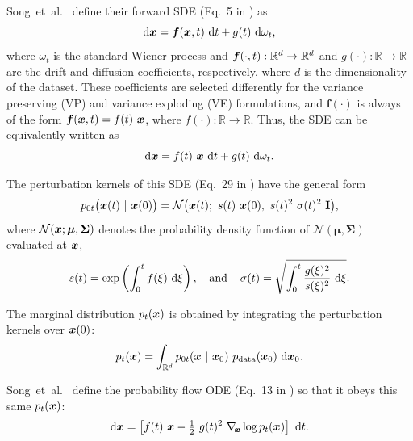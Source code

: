 Song~et~al.~\cite{Song2021sde} define their forward SDE (Eq.~5 in \cite{Song2021sde}) as
\begin{equation}
  \mathrm{d}\boldsymbol{x} = \boldsymbol{f}(\boldsymbol{x}, t) ~\mathrm{d} t + g(t) ~\mathrm{d} \omega_t
  \text{,}
\end{equation}
where $\omega_t$ is the standard Wiener process and $\boldsymbol{f}(\cdot, t): \mathbb{R}^d \rightarrow \mathbb{R}^d$ and $g(\cdot): \mathbb{R} \rightarrow \mathbb{R}$ are the drift and diffusion coefficients, respectively, where $d$ is the dimensionality of the dataset.
These coefficients are selected differently for the variance preserving (VP) and variance exploding (VE) formulations, and $\boldsymbol{f}(\cdot)$ is always of the form $\boldsymbol{f}(\boldsymbol{x}, t) = f(t) ~\boldsymbol{x}$, where $f(\cdot): \mathbb{R} \rightarrow \mathbb{R}$.
Thus, the SDE can be equivalently written as
\begin{equation}
  \label{eq:songsde}
  \mathrm{d}\boldsymbol{x} = f(t) ~\boldsymbol{x} ~\mathrm{d} t + g(t) ~\mathrm{d} \omega_t
  \text{.}
\end{equation}

The perturbation kernels of this SDE (Eq.~29 in \cite{Song2021sde}) have the general form
\begin{equation}
  \label{eq:songperturbation}
  p_{0t}\big( \boldsymbol{x}(t) ~|~ \boldsymbol{x}(0) \big) = \mathcal{N} \big( \boldsymbol{x}(t); ~s(t) ~\boldsymbol{x}(0), ~s(t)^2 ~\sigma(t)^2 ~\mathbf{I} \big)
  \text{,}
\end{equation}
where {$\mathcal{N}(\boldsymbol{x}; \boldsymbol{\mu}, \boldsymbol{\Sigma})$ denotes the probability density function of $\mathcal{N}(\boldsymbol{\mu}, \boldsymbol{\Sigma})$ evaluated at $\boldsymbol{x}$,}
\begin{equation}
  \label{eq:songscale}
  s(t) = \exp\left( \int_0^t f(\xi) ~\mathrm{d}\xi \right)
  \text{,}
  \hspace{4mm}\text{and}\hspace{4mm}
  \sigma(t) = \sqrt{\int_0^t \frac{g(\xi)^2}{s(\xi)^2} ~\mathrm{d}\xi}
  \text{.}
\end{equation}

The marginal distribution $p_t(\boldsymbol{x})$ is obtained by integrating the perturbation kernels over $\boldsymbol{x}(0)$:
\begin{equation}
  \label{eq:songmarginal}
  p_t(\boldsymbol{x}) = \int_{\mathbb{R}^d} p_{0t}(\boldsymbol{x} ~|~ \boldsymbol{x}_0) ~p_\text{data}(\boldsymbol{x}_0) ~\mathrm{d} \boldsymbol{x}_0
  \text{.}
\end{equation}

Song~et~al.~\cite{Song2021sde} define the probability flow ODE (Eq.~13 in \cite{Song2021sde}) so that it obeys this same $p_t(\boldsymbol{x})$:
\begin{equation}
  \label{eq:songode}
  \mathrm{d}\boldsymbol{x} = \left[ f(t) ~\boldsymbol{x} - \tfrac{1}{2} ~g(t)^2 ~\nabla_{\hspace{-0.5mm}\boldsymbol{x}} \log p_t(\boldsymbol{x}) \right] ~\mathrm{d} t
  \text{.}
\end{equation}

